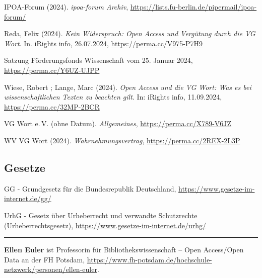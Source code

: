 \documentclass[a4paper,
fontsize=11pt,
oneside,
numbers=noperiodatend,
parskip=half-,
bibliography=totoc,
final
]{scrartcl}
\begin{document}
IPOA-Forum (2024). \emph{ipoa-forum Archiv},
\url{https://lists.fu-berlin.de/pipermail/ipoa-forum/}

Reda, Felix (2024). \emph{Kein Widerspruch: Open Access und Vergütung
durch die VG Wort}. In. iRights info, 26.07.2024,
\url{https://perma.cc/V975-P7H9}

Satzung Förderungsfonds Wissenschaft vom 25. Januar 2024,
\url{https://perma.cc/Y6UZ-UJPP}

Wiese, Robert ; Lange, Marc (2024). \emph{Open Access und die VG Wort:
Was es bei wissenschaftlichen Texten zu beachten gilt}. In: iRights
info, 11.09.2024, \url{https://perma.cc/32MP-2BCR}

VG Wort e.\,V. (ohne Datum). \emph{Allgemeines},
\url{https://perma.cc/X789-V6JZ}

WV VG Wort (2024). \emph{Wahrnehmungsvertrag},
\url{https://perma.cc/2REX-2L3P}

\hypertarget{gesetze}{%
\subsection{Gesetze}\label{gesetze}}

GG - Grundgesetz für die Bundesrepublik Deutschland,
\url{https://www.gesetze-im-internet.de/gg/}

UrhG - Gesetz über Urheberrecht und verwandte Schutzrechte
(Urheberrechtsgesetz), \url{https://www.gesetze-im-internet.de/urhg/}

\begin{center}\rule{0.5\linewidth}{0.5pt}\end{center}

\textbf{Ellen Euler} ist Professorin für Bibliothekswissenschaft -- Open
Access/Open Data an der FH Potsdam,
\url{https://www.fh-potsdam.de/hochschule-netzwerk/personen/ellen-euler}.
\end{document}
